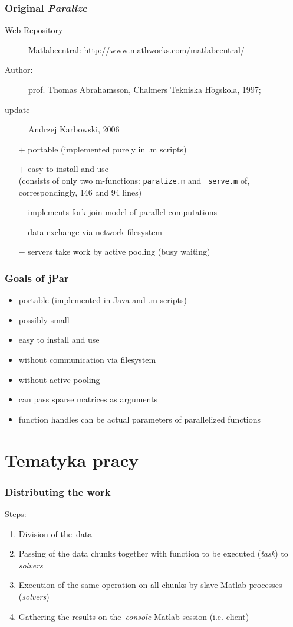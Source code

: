 \documentclass{beamer}
\begin{document}
\begin{frame}
\frametitle{Original \emph{Paralize}}
\begin{description}
 \item[Web Repository] Matlabcentral:
\url{http://www.mathworks.com/matlabcentral/}

\item[Author:] prof. Thomas Abrahamsson, Chalmers
Tekniska H$\ddot{o}$gskola, 1997;\\
\item[update]
Andrzej Karbowski, 2006\\
\end{description}
\begin{itemize}
\item [$+$] portable (implemented purely in .m scripts)
\item [$+$] easy to install and use\\
(consists of only two m-functions: {\tt paralize.m} and {\tt
serve.m} of, correspondingly, 146 and 94 lines)
\item [$-$] implements fork-join  model of parallel
computations
\item [$-$] data exchange via network filesystem
\item [$-$] servers take work by active pooling (busy waiting)
\end{itemize}
\end{frame}

\begin{frame}
\frametitle{Goals of jPar}
\begin{itemize}
\item portable (implemented in Java and .m scripts)
\item possibly small
\item easy to install and use
\item without communication via filesystem
\item without active pooling
\item can pass sparse matrices as arguments
\item function handles can be actual parameters
of parallelized functions
\end{itemize}
\end{frame}


\section{Tematyka pracy}

\begin{frame}
\frametitle{Distributing the work}
Steps:
\begin{enumerate}
\item Division of the~data
\item Passing of the data chunks together with function
      to be executed (\emph{task}) to \emph{solvers}
\item Execution of the same operation on all chunks  by slave Matlab processes (\emph{solvers})
\item Gathering the results on the~\emph{console} Matlab session (i.e. client)
\end{enumerate}
\end{frame}
\end{document}

